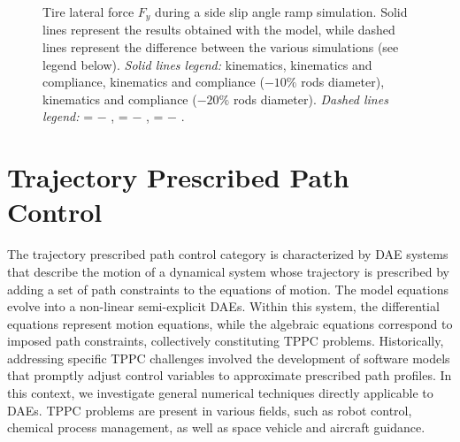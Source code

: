 \begin{figure}[!htp]
  \centering
  \small{}
  \caption{Tire lateral force $F_y$ during a side slip angle ramp simulation. Solid lines represent the results obtained with the \Simulink{} model, while dashed lines represent the difference between the various simulations (see legend below). \emph{Solid lines legend:}
  {\color{mycolor1}\raisebox{-.15pt}{$\blacksquare$}} kinematics, {\color{mycolor2}\raisebox{-.15pt}{$\blacksquare$}} kinematics and compliance, {\color{mycolor3}\raisebox{-.15pt}{$\blacksquare$}} kinematics and compliance ($-10\%$ rods diameter), {\color{mycolor5}\raisebox{-.15pt}{$\blacksquare$}} kinematics and compliance ($-20\%$ rods diameter).   \emph{Dashed lines legend:} {\color{mycolor1}\raisebox{-.15pt}{\scalebox{0.5}[1.0]{$\blacksquare$}}}{\color{mycolor2}\raisebox{-.15pt}{\scalebox{0.5}[1.0]{$\blacksquare$}}} = {\color{mycolor1}\raisebox{-.15pt}{$\blacksquare$}} $-$ {\color{mycolor2}\raisebox{-.15pt}{$\blacksquare$}}, {\color{mycolor1}\raisebox{-.15pt}{\scalebox{0.5}[1.0]{$\blacksquare$}}}{\color{mycolor3}\raisebox{-.15pt}{\scalebox{0.5}[1.0]{$\blacksquare$}}} = {\color{mycolor1}\raisebox{-.15pt}{$\blacksquare$}} $-$ {\color{mycolor3}\raisebox{-.15pt}{$\blacksquare$}},  {\color{mycolor1}\raisebox{-.15pt}{\scalebox{0.5}[1.0]{$\blacksquare$}}}{\color{mycolor5}\raisebox{-.15pt}{\scalebox{0.5}[1.0]{$\blacksquare$}}} = {\color{mycolor1}\raisebox{-.15pt}{$\blacksquare$}} $-$ {\color{mycolor5}\raisebox{-.15pt}{$\blacksquare$}}.
  }
  \label{chap4:fig:test_bench}
\end{figure}

\section{Trajectory Prescribed Path Control}
\label{chap4:sec:tppc}

The trajectory prescribed path control category is characterized by \ac{DAE} systems that describe the motion of a dynamical system whose trajectory is prescribed by adding a set of path constraints to the equations of motion. The model equations evolve into a non-linear semi-explicit \acp{DAE}. Within this system, the differential equations represent motion equations, while the algebraic equations correspond to imposed path constraints, collectively constituting \ac{TPPC} problems. Historically, addressing specific \ac{TPPC} challenges involved the development of software models that promptly adjust control variables to approximate prescribed path profiles. In this context, we investigate general numerical techniques directly applicable to \acp{DAE}. \ac{TPPC} problems are present in various fields, such as robot control, chemical process management, as well as space vehicle and aircraft guidance.

